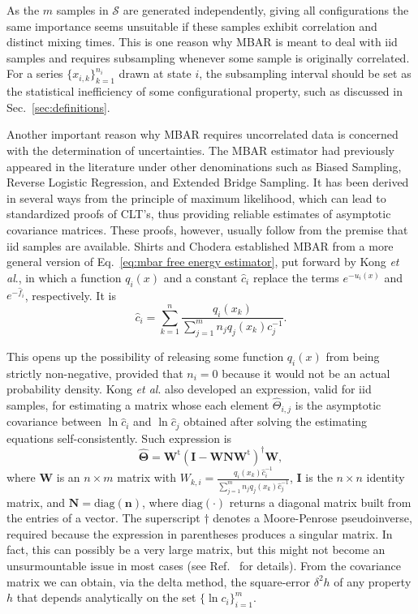 \documentclass[aip,jcp,reprint,amsmath,amssymb]{revtex4-1}
\newcommand{\mt}[1]{\boldsymbol{\mathbf{#1}}}           %
\newcommand{\vt}[1]{\boldsymbol{\mathbf{#1}}}           %
\newcommand{\tr}[1]{#1^\text{t}}                        %
\begin{document}
As the $m$ samples in $\mathcal S$ are generated independently, giving all configurations the same importance seems unsuitable if these samples exhibit correlation and distinct mixing times. This is one reason why MBAR is meant to deal with iid samples and requires subsampling whenever some sample is originally correlated.\cite{Shirts_2008} For a series $\{x_{i,k}\}_{k=1}^{n_i}$ drawn at state $i$, the subsampling interval should be set as the statistical inefficiency of some configurational property, such as discussed in Sec.~\ref{sec:definitions}.

Another important reason why MBAR requires uncorrelated data is concerned with the determination of uncertainties. The MBAR estimator had previously appeared in the literature under other denominations such as Biased Sampling,\cite{Vardi_1985, *Gill_1988} Reverse Logistic Regression,\cite{Geyer_1994} and Extended Bridge Sampling.\cite{Meng_1996, Kong_2003, Tan_2004} It has been derived in several ways from the principle of maximum likelihood, which can lead to standardized proofs of CLT's, thus providing reliable estimates of asymptotic covariance matrices.\cite{Pawitan_2001, Greene_2012} These proofs, however, usually follow from the premise that iid samples are available. Shirts and Chodera\cite{Shirts_2008} established MBAR from a more general version of Eq.~\eqref{eq:mbar free energy estimator}, put forward by Kong \textit{et al}.,\cite{Kong_2003} in which a function $q_i(x)$ and a constant $\hat c_i$ replace the terms $e^{-u_i(x)}$ and $e^{-\hat f_i}$, respectively. It is
\begin{equation}
\label{eq:mbar general estimator}
{\hat c}_i = \sum_{k=1}^n \frac{q_i(x_k)}{\sum_{j=1}^m n_j q_j(x_k) c_j^{-1}}.
\end{equation}

This opens up the possibility of releasing some function $q_i(x)$ from being strictly non-negative, provided that $n_i = 0$ because it would not be an actual probability density. Kong \textit{et al}.\cite{Kong_2003} also developed an expression, valid for iid samples, for estimating a matrix whose each element $\hat \Theta_{i,j}$ is the asymptotic covariance between $\ln \hat c_i$ and $\ln \hat c_j$ obtained after solving the estimating equations self-consistently. Such expression is
\begin{equation}
\label{eq:mbar covariance matrix}
\hat{\mt \Theta} = \tr{\mt W} (\mt I - {\mt W}{\mt N}\tr{\mt W})^\dag {\mt W},
\end{equation}
where $\mt W$ is an $n \times m$ matrix with $W_{k,i} = \frac{q_i(x_k) \hat c_i^{-1}}{\sum_{j=1}^m n_j q_j(x_k) \hat c_j^{-1}}$, $\mt I$ is the $n \times n$ identity matrix, and $\mt N = \text{diag}(\vt n)$, where $\text{diag}(\cdot)$ returns a diagonal matrix built from the entries of a vector. The superscript $\dag$ denotes a Moore-Penrose pseudoinverse, required because the expression in parentheses produces a singular matrix. In fact, this can possibly be a very large matrix, but this might not become an unsurmountable issue in most cases (see Ref.~ for details). From the covariance matrix we can obtain, via the delta method, the square-error $\delta^2 h$ of any property $h$ that depends analytically on the set $\{\ln c_i\}_{i=1}^m$.
\end{document}
